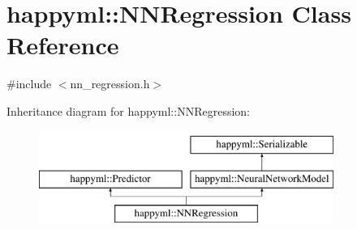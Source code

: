 \hypertarget{classhappyml_1_1NNRegression}{}\section{happyml\+:\+:N\+N\+Regression Class Reference}
\label{classhappyml_1_1NNRegression}


{\ttfamily \#include $<$nn\+\_\+regression.\+h$>$}

Inheritance diagram for happyml\+:\+:N\+N\+Regression\+:\begin{figure}[H]
\begin{center}
\leavevmode
\includegraphics[height=3.000000cm]{classhappyml_1_1NNRegression}
\end{center}
\end{figure}
